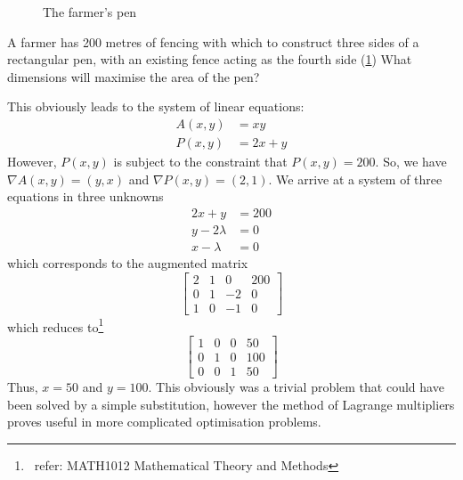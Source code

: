 \documentclass[10pt]{book}
\begin{document}
\begin{figure}
  \centering
  \caption{The farmer's pen}
  \label{fig:pen}
\end{figure}
A farmer has 200 metres of fencing with which to construct three sides of a rectangular pen, with an existing
fence acting as the fourth side (\cref{fig:pen}) What dimensions will maximise the area of the pen?

This obviously leads to the system of linear equations:
\begin{align*}
  A(x,y) &= xy \\
  P(x,y) &= 2x+y
\end{align*}
However, $P(x,y)$ is subject to the constraint that $P(x,y)=200$. So, we have $\nabla A(x,y) = (y,x)$ and
$\nabla P(x,y)=(2,1)$. We arrive at a system of three equations in three unknowns
\begin{align*}
  2x+y &= 200 \\
  y-2\lambda &= 0\\
  x-\lambda &= 0
\end{align*}
which corresponds to the augmented matrix
\[
  \left[
    \begin{array}{ccc|c}
      2 & 1 & 0 & 200 \\
      0 & 1 & -2 & 0 \\
      1 & 0 & -1 & 0
    \end{array}
  \right]
\]
which reduces to\footnote{\ refer: MATH1012 Mathematical Theory and Methods}
\[
  \left[
    \begin{array}{ccc|c}
      1 & 0 & 0 & 50 \\
      0 & 1 & 0 & 100 \\
      0 & 0 & 1 & 50
    \end{array}
  \right]
\]
Thus, $x=50$ and $y=100$. This obviously was a trivial problem that could have been solved by a simple
substitution, however the method of Lagrange multipliers proves useful in more complicated optimisation problems.
\end{document}
